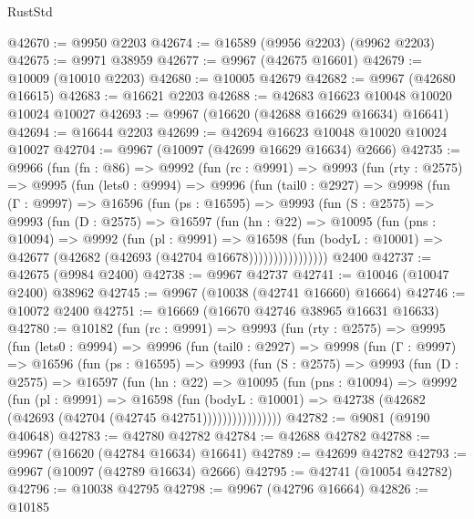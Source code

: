 \begin{lexlean}{RustStd}
\begin{coremodule}
@42670 := @9950 @2203
@42674 := @16589 (@9956 @2203) (@9962 @2203)
@42675 := @9971 @38959
@42677 := @9967 (@42675 @16601)
@42679 := @10009 (@10010 @2203)
@42680 := @10005 @42679
@42682 := @9967 (@42680 @16615)
@42683 := @16621 @2203
@42688 := @42683 @16623 @10048 @10020 @10024 @10027
@42693 := @9967 (@16620 (@42688 @16629 @16634) @16641)
@42694 := @16644 @2203
@42699 := @42694 @16623 @10048 @10020 @10024 @10027
@42704 := @9967 (@10097 (@42699 @16629 @16634) @2666)
@42735 := @9966
    (fun (fn : @86) =>
    @9992
      (fun (rc : @9991) =>
      @9993
        (fun (rty : @2575) =>
        @9995
          (fun (lets0 : @9994) =>
          @9996
            (fun (tail0 : @2927) =>
            @9998
              (fun (Γ : @9997) =>
              @16596
                (fun (ps : @16595) =>
                @9993
                  (fun (S : @2575) =>
                  @9993
                    (fun (D : @2575) =>
                    @16597
                      (fun (hn : @22) =>
                      @10095
                        (fun (pns : @10094) =>
                        @9992
                          (fun (pl : @9991) =>
                          @16598
                            (fun (bodyL : @10001) =>
                            @42677 (@42682 (@42693 (@42704 @16678))))))))))))))))
    @2400
@42737 := @42675 (@9984 @2400)
@42738 := @9967 @42737
@42741 := @10046 (@10047 @2400) @38962
@42745 := @9967 (@10038 (@42741 @16660) @16664)
@42746 := @10072 @2400
@42751 := @16669 (@16670 @42746 @38965 @16631 @16633)
@42780 := @10182
    (fun (rc : @9991) =>
    @9993
      (fun (rty : @2575) =>
      @9995
        (fun (lets0 : @9994) =>
        @9996
          (fun (tail0 : @2927) =>
          @9998
            (fun (Γ : @9997) =>
            @16596
              (fun (ps : @16595) =>
              @9993
                (fun (S : @2575) =>
                @9993
                  (fun (D : @2575) =>
                  @16597
                    (fun (hn : @22) =>
                    @10095
                      (fun (pns : @10094) =>
                      @9992
                        (fun (pl : @9991) =>
                        @16598
                          (fun (bodyL : @10001) =>
                          @42738 (@42682 (@42693 (@42704 (@42745 @42751))))))))))))))))
@42782 := @9081 (@9190 @40648)
@42783 := @42780 @42782
@42784 := @42688 @42782
@42788 := @9967 (@16620 (@42784 @16634) @16641)
@42789 := @42699 @42782
@42793 := @9967 (@10097 (@42789 @16634) @2666)
@42795 := @42741 (@10054 @42782)
@42796 := @10038 @42795
@42798 := @9967 (@42796 @16664)
@42826 := @10185

\end{coremodule}
\end{lexlean}
